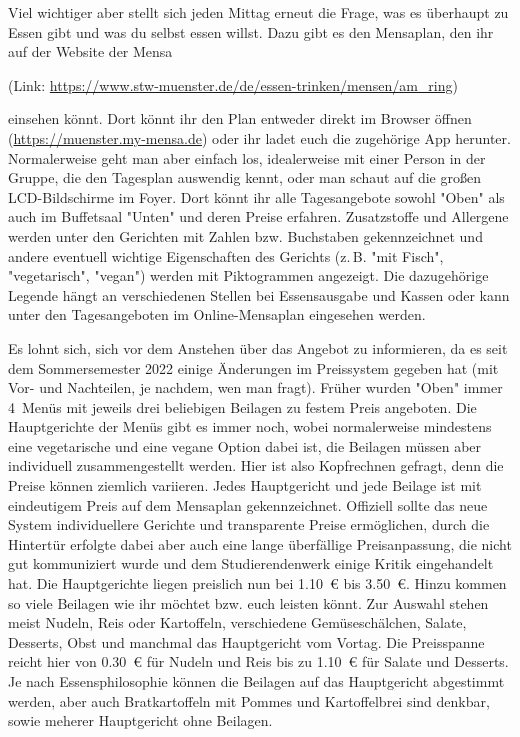\begin{multicols}{2}
Viel wichtiger aber stellt sich jeden Mittag erneut die Frage, was es überhaupt zu Essen gibt und was du selbst essen willst.
Dazu gibt es den Mensaplan, den ihr auf der Website der Mensa

\begin{center}
	(Link:
	\url{https://www.stw-muenster.de/de/essen-trinken/mensen/am_ring})
\end{center}

einsehen könnt. 
Dort könnt ihr den Plan entweder direkt im Browser öffnen (\url{https://muenster.my-mensa.de}) oder ihr ladet euch die zugehörige App herunter.
Normalerweise geht man aber einfach los, idealerweise mit einer Person in der Gruppe, die den Tagesplan auswendig kennt, oder man schaut auf die großen LCD-Bildschirme im Foyer.
Dort könnt ihr alle Tagesangebote sowohl "Oben" als auch im Buffetsaal "Unten" und deren Preise erfahren.
Zusatzstoffe und Allergene werden unter den Gerichten mit Zahlen bzw. Buchstaben gekennzeichnet und andere eventuell wichtige Eigenschaften des Gerichts (z.\,B. "mit Fisch", "vegetarisch", "vegan") werden mit Piktogrammen angezeigt.
Die dazugehörige Legende hängt an verschiedenen Stellen bei Essensausgabe und Kassen oder kann unter den Tagesangeboten im Online-Mensaplan eingesehen werden.

Es lohnt sich, sich vor dem Anstehen über das Angebot zu informieren, da es seit dem Sommersemester 2022 einige Änderungen im Preissystem gegeben hat (mit Vor- und Nachteilen, je nachdem, wen man fragt).
Früher wurden "Oben" immer 4~Menüs mit jeweils drei beliebigen Beilagen zu festem Preis angeboten.
Die Hauptgerichte der Menüs gibt es immer noch, wobei normalerweise mindestens eine vegetarische und eine vegane Option dabei ist, die Beilagen müssen aber individuell zusammengestellt werden.
Hier ist also Kopfrechnen gefragt, denn die Preise können ziemlich variieren.
Jedes Hauptgericht und jede Beilage ist mit eindeutigem Preis auf dem Mensaplan gekennzeichnet.
Offiziell sollte das neue System individuellere Gerichte und transparente Preise ermöglichen, durch die Hintertür erfolgte dabei aber auch eine lange überfällige Preisanpassung, die nicht gut kommuniziert wurde und dem Studierendenwerk einige Kritik eingehandelt hat.
Die Hauptgerichte liegen preislich nun bei \SI{1,10}{\euro} bis \SI{3,50}{\euro}.
Hinzu kommen so viele Beilagen wie ihr möchtet bzw. euch leisten könnt.
Zur Auswahl stehen meist Nudeln, Reis oder Kartoffeln, verschiedene Gemüseschälchen, Salate, Desserts, Obst und manchmal das Hauptgericht vom Vortag.
Die Preisspanne reicht hier von \SI{0,30}{\euro} für Nudeln und Reis bis zu \SI{1,10}{\euro} für Salate und Desserts.
Je nach Essensphilosophie können die Beilagen auf das Hauptgericht abgestimmt werden, aber auch Bratkartoffeln mit Pommes und Kartoffelbrei sind denkbar, sowie meherer Hauptgericht ohne Beilagen.


\end{multicols}
